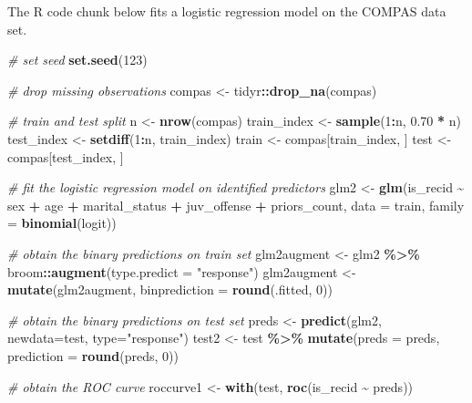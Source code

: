\documentclass[12pt, twoside]{amherstthesis}
\newenvironment{Shaded}{\begin{snugshade}}{\end{snugshade}}
\newcommand{\AttributeTok}[1]{\textcolor[rgb]{0.13,0.29,0.53}{#1}}
\newcommand{\CommentTok}[1]{\textcolor[rgb]{0.56,0.35,0.01}{\textit{#1}}}
\newcommand{\DecValTok}[1]{\textcolor[rgb]{0.00,0.00,0.81}{#1}}
\newcommand{\FloatTok}[1]{\textcolor[rgb]{0.00,0.00,0.81}{#1}}
\newcommand{\FunctionTok}[1]{\textcolor[rgb]{0.13,0.29,0.53}{\textbf{#1}}}
\newcommand{\NormalTok}[1]{#1}
\newcommand{\OtherTok}[1]{\textcolor[rgb]{0.56,0.35,0.01}{#1}}
\newcommand{\SpecialCharTok}[1]{\textcolor[rgb]{0.81,0.36,0.00}{\textbf{#1}}}
\newcommand{\StringTok}[1]{\textcolor[rgb]{0.31,0.60,0.02}{#1}}
\begin{document}
\noindent The R code chunk below fits a logistic regression model on the COMPAS data set.
\begin{Shaded}
\begin{Highlighting}[]
\CommentTok{\# set seed}
\FunctionTok{set.seed}\NormalTok{(}\DecValTok{123}\NormalTok{)}

\CommentTok{\# drop missing observations}
\NormalTok{compas }\OtherTok{\textless{}{-}}\NormalTok{ tidyr}\SpecialCharTok{::}\FunctionTok{drop\_na}\NormalTok{(compas) }

\CommentTok{\# train and test split}
\NormalTok{n }\OtherTok{\textless{}{-}} \FunctionTok{nrow}\NormalTok{(compas)}
\NormalTok{train\_index }\OtherTok{\textless{}{-}} \FunctionTok{sample}\NormalTok{(}\DecValTok{1}\SpecialCharTok{:}\NormalTok{n, }\FloatTok{0.70} \SpecialCharTok{*}\NormalTok{ n) }
\NormalTok{test\_index }\OtherTok{\textless{}{-}} \FunctionTok{setdiff}\NormalTok{(}\DecValTok{1}\SpecialCharTok{:}\NormalTok{n, train\_index)}
\NormalTok{train }\OtherTok{\textless{}{-}}\NormalTok{ compas[train\_index, ]}
\NormalTok{test }\OtherTok{\textless{}{-}}\NormalTok{ compas[test\_index, ]}

\CommentTok{\# fit the logistic regression model on identified predictors}
\NormalTok{glm2 }\OtherTok{\textless{}{-}} \FunctionTok{glm}\NormalTok{(is\_recid }\SpecialCharTok{\textasciitilde{}}\NormalTok{ sex }\SpecialCharTok{+}\NormalTok{ age }\SpecialCharTok{+}\NormalTok{ marital\_status }\SpecialCharTok{+}
\NormalTok{              juv\_offense }\SpecialCharTok{+}\NormalTok{ priors\_count,}
            \AttributeTok{data =}\NormalTok{ train,}
            \AttributeTok{family =} \FunctionTok{binomial}\NormalTok{(logit))}

\CommentTok{\# obtain the binary predictions on train set}
\NormalTok{glm2augment }\OtherTok{\textless{}{-}}\NormalTok{ glm2 }\SpecialCharTok{\%\textgreater{}\%} 
\NormalTok{  broom}\SpecialCharTok{::}\FunctionTok{augment}\NormalTok{(}\AttributeTok{type.predict =} \StringTok{"response"}\NormalTok{)}
\NormalTok{glm2augment }\OtherTok{\textless{}{-}} \FunctionTok{mutate}\NormalTok{(glm2augment, }\AttributeTok{binprediction =} \FunctionTok{round}\NormalTok{(.fitted, }\DecValTok{0}\NormalTok{)) }

\CommentTok{\# obtain the binary predictions on test set }
\NormalTok{preds }\OtherTok{\textless{}{-}} \FunctionTok{predict}\NormalTok{(glm2, }\AttributeTok{newdata=}\NormalTok{test, }\AttributeTok{type=}\StringTok{"response"}\NormalTok{)}
\NormalTok{test2 }\OtherTok{\textless{}{-}}\NormalTok{ test }\SpecialCharTok{\%\textgreater{}\%} 
  \FunctionTok{mutate}\NormalTok{(}\AttributeTok{preds =}\NormalTok{ preds,}
         \AttributeTok{prediction =} \FunctionTok{round}\NormalTok{(preds, }\DecValTok{0}\NormalTok{)) }

\CommentTok{\# obtain the ROC curve}
\NormalTok{roccurve1 }\OtherTok{\textless{}{-}} \FunctionTok{with}\NormalTok{(test, }\FunctionTok{roc}\NormalTok{(is\_recid }\SpecialCharTok{\textasciitilde{}}\NormalTok{ preds))}
\end{Highlighting}
\end{Shaded}
\end{document}
